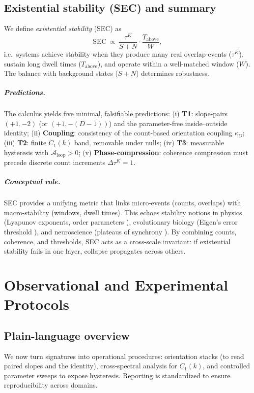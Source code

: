 \documentclass[12pt,a4paper,oneside]{scrreprt}
\begin{document}
\section{Existential stability (SEC) and summary}\label{sec:ur-predictions}

We define \emph{existential stability} (SEC) as
\[
\mathrm{SEC} \ \propto \ \frac{\tau^K}{S+N} \cdot \frac{T_{\mathrm{above}}}{W},
\]
i.e.\ systems achieve stability when they produce many real overlap-events ($\tau^K$), 
sustain long dwell times ($T_{\mathrm{above}}$), and operate within a well-matched window ($W$). 
The balance with background states ($S+N$) determines robustness.

\paragraph{Predictions.} 
The calculus yields five minimal, falsifiable predictions:  
(i) \textbf{T1}: slope-pairs $(+1,-2)$ (or $(+1,-(D{-}1))$) and the parameter-free inside–outside identity;  
(ii) \textbf{Coupling}: consistency of the count-based orientation coupling $\kappa_O$;  
(iii) \textbf{T2}: finite $C_1(k)$ band, removable under nulls;  
(iv) \textbf{T3}: measurable hysteresis with $\mathcal A_{\mathrm{loop}}>0$;  
(v) \textbf{Phase-compression}: coherence compression must precede discrete count increments $\Delta \tau^K = 1$.  

\paragraph{Conceptual role.} 
SEC provides a unifying metric that links micro-events (counts, overlaps) with 
macro-stability (windows, dwell times). 
This echoes stability notions in physics (Lyapunov exponents, order parameters \citep{Stanley1971Phase}), 
evolutionary biology (Eigen’s error threshold \citep{Eigen1971,Szathmary1995}), 
and neuroscience (plateaus of synchrony \citep{Kelso1995Coordination,Friston2010FEP}). 
By combining counts, coherence, and thresholds, SEC acts as a cross-scale invariant: 
if existential stability fails in one layer, collapse propagates across others.

\bigskip
\chapter{Observational and Experimental Protocols}

\section*{Plain-language overview}
We now turn signatures into operational procedures: 
orientation stacks (to read paired slopes and the identity), 
cross-spectral analysis for $C_1(k)$, 
and controlled parameter sweeps to expose hysteresis. 
Reporting is standardized to ensure reproducibility across domains.
\end{document}
